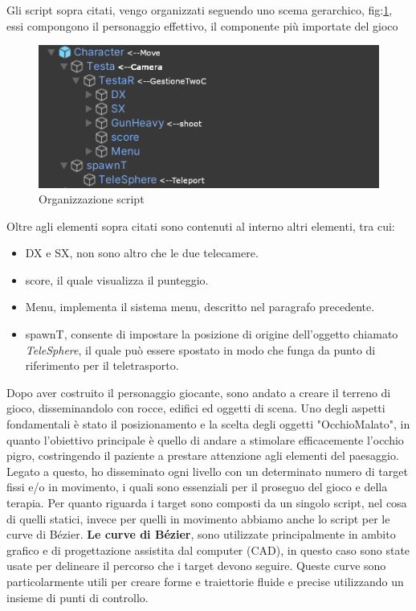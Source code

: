 \documentclass[10pt,a4paper]{article}
\begin{document}
    Gli script sopra citati, vengo organizzati seguendo uno scema gerarchico, fig:\ref{fig:script_character}, essi compongono il personaggio effettivo, il componente più importate del gioco
    \begin{figure}[H]
    	\centering
    	\includegraphics[width=0.8\linewidth]{image/script_character}
    	\caption{Organizzazione script}
    	\label{fig:script_character}
    \end{figure}
    Oltre agli elementi sopra citati sono contenuti al interno altri elementi, tra cui:
    \begin{itemize}
        \item DX e SX, non sono altro che le due telecamere.
        \item score, il quale visualizza il punteggio.
        \item Menu, implementa il sistema menu, descritto nel paragrafo precedente.
        \item spawnT, consente di impostare la posizione di origine dell'oggetto chiamato \textit{TeleSphere}, il quale può essere spostato in modo che funga da punto di riferimento per il teletrasporto.
    \end{itemize}
    Dopo aver costruito il personaggio giocante, sono andato a creare il terreno di gioco, disseminandolo con rocce\cite{Rock_asset}, edifici ed oggetti\cite{Pack_asset} di scena.
    Uno degli aspetti fondamentali è stato il posizionamento e la scelta degli oggetti "OcchioMalato", in quanto l'obiettivo principale è quello di andare a stimolare efficacemente l'occhio pigro, costringendo il paziente a prestare attenzione agli elementi del paesaggio.
    Legato a questo, ho disseminato ogni livello con un determinato numero di target fissi e/o in movimento, i quali sono essenziali per il proseguo del gioco e della terapia.
    Per quanto riguarda i target sono composti da un singolo script, nel cosa di quelli statici, invece per quelli in movimento abbiamo anche lo script per le curve di Bézier\cite{Pack_asset}.
    \textbf{Le curve di Bézier}\cite{Path_asset}, sono utilizzate principalmente in ambito grafico e di progettazione assistita dal computer (CAD), in questo caso sono state usate per delineare il percorso che i target devono seguire. Queste curve sono particolarmente utili per creare forme e traiettorie fluide e precise utilizzando un insieme di punti di controllo.
\end{document}
